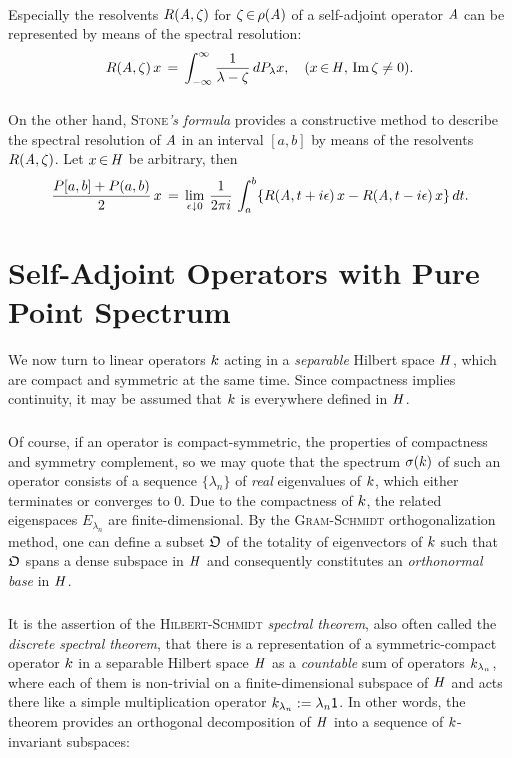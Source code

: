 \documentclass[11pt,twoside]{article}
\begin{document}
%

\paragraph*{}
Especially the resolvents $R(\mathit{A},\zeta)$ for $\zeta {\,\in\,} \rho(\mathit{A})$ 
of a self-adjoint operator $\mathit{A}$
can be represented by means of the spectral resolution:
\[
R(\mathit{A},\zeta) \, x \,=\, \int_{-\infty}^{\infty}
\frac{1}{\lambda-\zeta} \, dP_{\lambda} x,
\quad (x {\,\in\,} \mathit{H}, \, \operatorname{Im} \zeta \neq 0).
\]

\subparagraph*{}
On the other hand,
\textsc{Stone}\textit{'s formula} provides a constructive method
to describe the spectral resolution of $\mathit{A}$ in an interval $[a,b]$
by means of the resolvents $R(\mathit{A},\zeta)$.
Let $x {\,\in\,} \mathit{H}$ be arbitrary, then
\[
\frac{P[a,b] + P(a,b)}{2} \, x
\,=\,
\lim_{\epsilon \downarrow 0} \, \frac{1}{2 \pi i} \,
\int_a^b
\{R(\mathit{A},t + i \epsilon)\,x -
  R(\mathit{A},t - i \epsilon)\,x \} \,
  dt.
\]

\section{Self-Adjoint Operators with Pure Point Spectrum}
We now turn to linear operators $k$
acting in a \textit{separable} Hilbert space $\mathit{H}$,
which are compact and symmetric at the same time.
Since compactness implies continuity,
it may be assumed that $k$ is everywhere defined in $\mathit{H}$.

\subparagraph*{}
Of course,
if an operator is compact-symmetric,
the properties of compactness and symmetry complement,
so we may quote
that the spectrum $\sigma(k)$ of such an operator consists
of a sequence $\{\lambda_n\}$ of \textit{real} eigenvalues of $k$,
which either terminates or converges to $0$.
Due to the compactness of $k$,
the related eigenspaces $E_{\lambda_n}$ are finite-dimensional.
By the \textsc{Gram-Schmidt} orthogonalization method,
one can define a subset $\mathfrak{O}$ of the totality
of eigenvectors of $k$
such that $\mathfrak{O}$ spans a dense subspace in $\mathit{H}$
and consequently constitutes an \textit{orthonormal base} in $\mathit{H}$.

\subparagraph*{}
It is the assertion of the \textsc{Hilbert-Schmidt} \textit{spectral theorem},
also often called the \textit{discrete spectral theorem},
that there is a representation of a symmetric-compact operator $k$
in a separable Hilbert space $\mathit{H}$
as a \textit{countable} sum of operators $k_{\lambda_n}$,
where each of them is non-trivial on a finite-dimensional subspace
of $\mathit{H}$ and acts there like a simple multiplication operator
$k_{\lambda_n} := \lambda_n {\mathsf{1}}$.
In other words,
the theorem provides an orthogonal decomposition of $\mathit{H}$
into a sequence of $k$-invariant subspaces:
\end{document}
